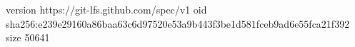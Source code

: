 version https://git-lfs.github.com/spec/v1
oid sha256:e239e29160a86baa63c6d97520e53a9b443f3be1d581fceb9ad6e55fca21f392
size 50641

